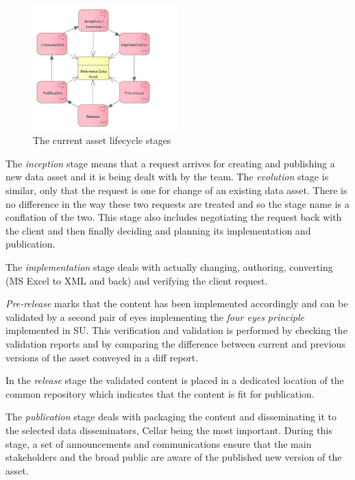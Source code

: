 	\begin{figure}[h]
		\centering
		\includegraphics[width=0.5\textwidth]{images/business/Lifecycle process only (current).png}
		\caption{The current asset lifecycle stages}
		\label{fig:lifecycle-current-stages}
	\end{figure} 

	The \textit{inception} stage means that a request arrives for creating and publishing a new data asset and it is being dealt with by the team. The \textit{evolution} stage is similar, only that the request is one for change of an existing data asset. There is no difference in the way these two requests are treated and so the stage name is a conflation of the two. This stage also includes negotiating the request back with the client and then finally deciding and planning its implementation and publication. 
	
	The \textit{implementation} stage deals with actually changing, authoring, converting (MS Excel to XML and back) and verifying the client request. 
	
	\textit{Pre-release} marks that the content has been implemented accordingly and can be validated by a second pair of eyes implementing the \textit{four eyes principle} implemented in SU. This verification and validation is performed by checking the validation reports and by comparing the difference between current and previous versions of the asset conveyed in a diff report. 
	
	In the \textit{release} stage the validated content is placed in a dedicated location of the common repository which indicates that the content is fit for publication. 
	
	The \textit{publication} stage deals with packaging the content and disseminating it to the selected data disseminators, Cellar being the most important. During this stage, a set of announcements and communications ensure that the main stakeholders and the broad public are aware of the published new version of the asset. 
	
